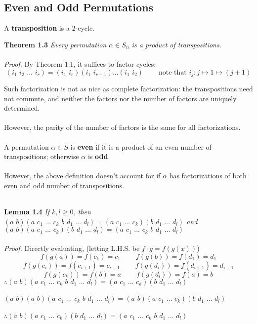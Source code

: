 \documentclass{article}
\begin{document}
\subsection{Even and Odd Permutations}
A \textbf{transposition} is a \(2\)-cycle.
\begin{redrules}\color{red}
\textbf{Theorem 1.3} \textit{Every permutation \(\alpha\in S_n\) is a product of transpositions.}\color{black}\\\\
\textit{Proof.} By \color{gray}Theorem 1.1\color{black}, it suffices to factor cycles:
\[(i_1\,\,i_2\,\,...\,\,i_r)=(i_1\,\,i_r)(i_1\,\,i_{r-1})...(i_1\,\,i_2)\;\;\;\;\;\;\;\;\text{note that }i_j:j\mapsto 1\mapsto (j+1)\]
\end{redrules}
Such factorization is not as nice as complete factorization: the transpositions need not commute, and neither the factors nor the number of factors are uniquely determined.\\\\
However, the parity of the number of factors is the same for all factorizations.\\\\
A permutation \(\alpha\in S\) is \textbf{even} if it is a product of an even number of transpositions; otherwise \(\alpha\) is \textbf{odd}.\\\\
However, the above definition doesn't account for if \(\alpha\) has factorizations of both even and odd number of transpositions.\\\\
\begin{greenrules}\color{OliveGreen}
\textbf{Lemma 1.4} \textit{If \(k,l\ge 0\), then\\  \null\qquad\((a\,\,b)(a\,\,c_1\,\,...\,\,c_k\,\,b\,\,d_1\,\,...\,\,d_l)=(a\,\,c_1\,\,...\,\,c_k)(b\,\,d_1\,\,...\,\,d_l)\) and \\
\null\qquad\((a\,\,b)(a\,\,c_1\,\,...\,\,c_k)(b\,\,d_1\,\,...\,\,d_l)=(a\,\,c_1\,\,...\,\,c_k\,\,b\,\,d_1\,\,...\,\,d_l)\)}\\\\\color{black}
\textit{Proof.} Directly evaluating, (letting L.H.S. be \(f\cdot g=f(g(x))\))
\[f(g(a))=f(c_1)=c_1\;\;\;\;\;\;\;\;f(g(b))=f(d_1)=d_1\]
\[f(g(c_i))=f(c_{i+1})=c_{i+1}\;\;\;\;\;\;\;\;f(g(d_i))=f(d_{i+1})=d_{i+1}\]
\[f(g(c_k))=f(b)=a\;\;\;\;\;\;\;\;f(g(d_l))=f(a)=b\]
\null\qquad\(\therefore(a\,\,b)(a\,\,c_1\,\,...\,\,c_k\,\,b\,\,d_1\,\,...\,\,d_l)=(a\,\,c_1\,\,...\,\,c_k)(b\,\,d_1\,\,...\,\,d_l)\)\\\\
\null\qquad\((a\,\,b)(a\,\,b)(a\,\,c_1\,\,...\,\,c_k\,\,b\,\,d_1\,\,...\,\,d_l)=(a\,\,b)(a\,\,c_1\,\,...\,\,c_k)(b\,\,d_1\,\,...\,\,d_l)\)\\\\
\null\qquad\(\therefore(a\,\,b)(a\,\,c_1\,\,...\,\,c_k)(b\,\,d_1\,\,...\,\,d_l)=(a\,\,c_1\,\,...\,\,c_k\,\,b\,\,d_1\,\,...\,\,d_l)\)
\end{greenrules}
\end{document}
